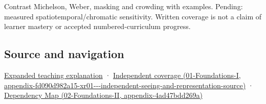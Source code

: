 Contrast Michelson, Weber, masking and crowding with examples. Pending: measured spatiotemporal/chromatic sensitivity. Written coverage is not a claim of learner mastery or accepted numbered-curriculum progress.

\subsection{Source and navigation}\label{appendix-b3aa9e8e01ad-source-and-navigation}

\hyperref[04-visual-computing-ii-ch042-visibility-is-about-contrast-conditions-and-tasks]{Expanded teaching explanation} · \href{../01-Foundations-I/main.pdf\#nameddest=appendix-fd090d982a15-xr01---independent-seeing-and-representation-source}{Independent coverage (01-Foundations-I, appendix-fd090d982a15-xr01-\/-\/-independent-seeing-and-representation-source)} · \href{../02-Foundations-II/main.pdf\#nameddest=appendix-4ad47bdd269a}{Dependency Map (02-Foundations-II, appendix-4ad47bdd269a)}
